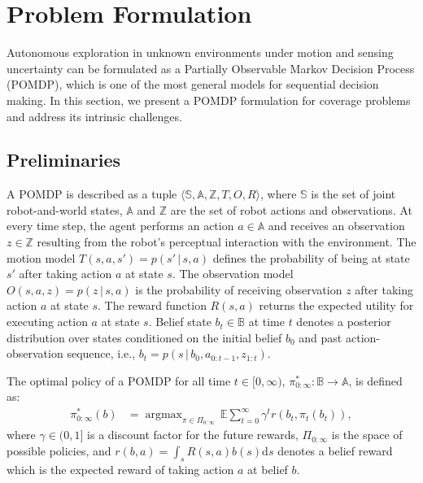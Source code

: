 \documentclass[letterpaper]{article} %
\newcommand{\phdone}[1]{} %
\newcommand{\acomm}[1]{{\color{cyan}Ali:#1}} %
\newcommand{\argmax}{\mathop{\mathrm{argmax}}}
\begin{document}
\section{Problem Formulation}
\label{sec:formulation}

Autonomous exploration in unknown environments under motion and sensing uncertainty can be formulated as a Partially Observable Markov Decision Process (POMDP), which is one of the most general models for sequential decision making.
In this section, we present a POMDP formulation for coverage problems and address its intrinsic challenges.

\subsection{Preliminaries}
\phdone{POMDP Elements}
A POMDP is described as a tuple $\langle \mathbb{S}, \mathbb{A}, \mathbb{Z}, T, O, R \rangle$, where $\mathbb{S}$ is the set of joint robot-and-world states, $\mathbb{A}$ and $\mathbb{Z}$ are the set of robot actions and observations.
At every time step, the agent performs an action $a \in \mathbb{A}$ and receives an observation $z \in \mathbb{Z}$ resulting from the robot's perceptual interaction with the environment.
The motion model $T(s, a, s') = p(s'\,|\,s, a)$ defines the probability of being at state $s'$ after taking action $a$ at state $s$.
The observation model $O(s, a, z) = p(z\,|\,s, a)$ is the probability of receiving observation $z$ after taking action $a$ at state $s$.
The reward function $R(s, a)$ returns the expected utility for executing action $a$ at state $s$.
Belief state $b_t \in \mathbb{B}$ at time $t$ denotes a posterior distribution over states conditioned on the initial belief $b_0$ and past action-observation sequence, i.e., $b_{t} = p(s \,|\, b_0, a_{0:t-1}, z_{1:t})$.

\phdone{POMDP Objective function}
The optimal policy of a POMDP for all time $t \in [0,\infty)$, $\pi_{0:\infty}^* \! : \mathbb{B} \to \mathbb{A}$, is defined as:
\begin{align}
  \pi_{0:\infty}^*(b) &= \argmax_{\pi \in \Pi_{0:\infty}} \, \mathbb{E} \sum_{t=0}^{\infty} \gamma^t r(b_t, \pi_t(b_t)),
  \label{eq:objective_function}
\end{align}
where $\gamma \in (0, 1]$ is a discount factor for the future rewards, $\Pi_{0:\infty}$ is the space of possible policies, and $r(b,a)=\int_s R(s,a)b(s)\mathrm{d}s$ denotes a belief reward which is the expected reward of taking action $a$ at belief $b$. %
\end{document}
